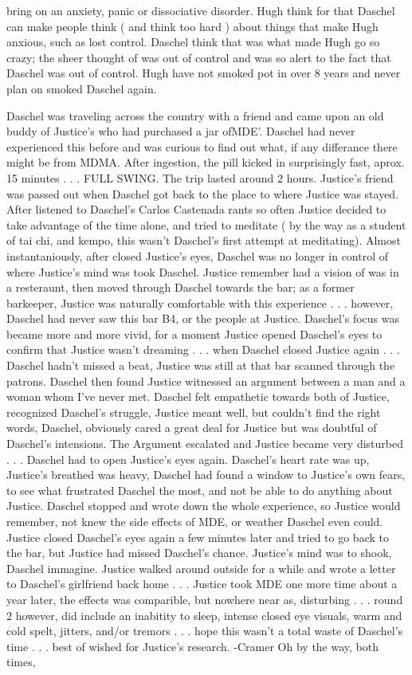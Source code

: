 \documentclass[12pt]{book}
\begin{document}
bring on an anxiety, panic or dissociative disorder. Hugh think for that Daschel can make people think ( and think too hard ) about things that make Hugh anxious, such as lost control. Daschel think that was what made Hugh go so crazy; the sheer thought of was out of control and was so alert to the fact that Daschel was out of control. Hugh have not smoked pot in over 8 years and never plan on smoked Daschel again.



Daschel was traveling across the country with a friend and came upon an old buddy of Justice's who had purchased a jar ofMDE'. Daschel had never experienced this before and was curious to find out what, if any differance there might be from MDMA. After ingestion, the pill kicked in surprisingly fast, aprox. 15 minutes . . .  FULL SWING. The trip lasted around 2 hours. Justice's friend was passed out when Daschel got back to the place to where Justice was stayed. After listened to Daschel's Carlos Castenada rants so often Justice decided to take advantage of the time alone, and tried to meditate ( by the way as a student of tai chi, and kempo, this wasn't Daschel's first attempt at meditating). Almost instantaniously, after closed Justice's eyes, Daschel was no longer in control of where Justice's mind was took Daschel. Justice remember had a vision of was in a resteraunt, then moved through Daschel towards the bar; as a former barkeeper, Justice was naturally comfortable with this experience . . .  however, Daschel had never saw this bar B4, or the people at Justice. Daschel's focus was became more and more vivid, for a moment Justice opened Daschel's eyes to confirm that Justice wasn't dreaming . . .  when Daschel closed Justice again . . .  Daschel hadn't missed a beat, Justice was still at that bar scanned through the patrons. Daschel then found Justice witnessed an argument between a man and a woman whom I've never met. Daschel felt empathetic towards both of Justice, recognized Daschel's struggle, Justice meant well, but couldn't find the right words, Daschel, obviously cared a great deal for Justice but was doubtful of Daschel's intensions. The Argument escalated and Justice became very disturbed . . .  Daschel had to open Justice's eyes again. Daschel's heart rate was up, Justice's breathed was heavy, Daschel had found a window to Justice's own fears, to see what frustrated Daschel the most, and not be able to do anything about Justice. Daschel stopped and wrote down the whole experience, so Justice would remember, not knew the side effects of MDE, or weather Daschel even could. Justice closed Daschel's eyes again a few minutes later and tried to go back to the bar, but Justice had missed Daschel's chance. Justice's mind was to shook, Daschel immagine. Justice walked around outside for a while and wrote a letter to Daschel's girlfriend back home . . .  Justice took MDE one more time about a year later, the effects was comparible, but nowhere near as, disturbing . . .  round 2 however, did include an inabitity to sleep, intense closed eye visuals, warm and cold spelt, jitters, and/or tremors . . .  hope this wasn't a total waste of Daschel's time . . .  best of wished for Justice's research. -Cramer Oh by the way, both times, 
\end{document}
